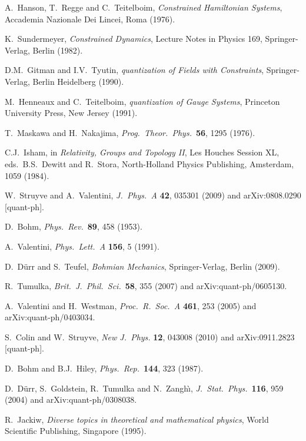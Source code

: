 \documentclass[12pt]{article}
\begin{document}
\begin{thebibliography}{100}
{A.\ Hanson, T.\ Regge and C.\ Teitelboim, {\em Constrained Hamiltonian
  Systems}, Accademia Nazionale Dei Lincei, Roma (1976).}

{K.\ Sundermeyer, {\em Constrained Dynamics}, Lecture Notes in Physics 169,
  Springer-Verlag, Berlin (1982).}

{D.M.\ Gitman and I.V.\ Tyutin, {\em quantization of Fields with Constraints},
  Springer-Verlag, Berlin Heidelberg (1990).}

{M.\ Henneaux and C.\ Teitelboim, {\em quantization of Gauge Systems},
  Princeton University Press, New Jersey (1991).}

{T.\ Maskawa and H.\ Nakajima, {\em Prog.\ Theor.\ Phys.}\ {\bf 56}, 1295
  (1976).}

{C.J.\ Isham, in {\em Relativity, Groups and Topology II}, Les Houches Session
  XL, eds.\ B.S.\ Dewitt and R.\ Stora, North-Holland Physics Publishing,
  Amsterdam, 1059 (1984).}

{W.\ Struyve and A.\ Valentini, {\em J.\ Phys.\ A} {\bf 42}, 035301 (2009) and
  arXiv:0808.0290 [quant-ph].}

{D.\ Bohm, {\em Phys.\ Rev.}\ {\bf 89}, 458 (1953).}

{A.\ Valentini, {\em Phys.\ Lett.\ A} {\bf 156}, 5 (1991).}

{D.\ D\"urr and S.\ Teufel, {\em Bohmian Mechanics}, Springer-Verlag, Berlin
  (2009).}

{R.\ Tumulka, {\em Brit.\ J.\ Phil.\ Sci.}\ {\bf 58}, 355 (2007) and
  arXiv:quant-ph/0605130.}

{A.\ Valentini and H.\ Westman, {\em Proc.\ R.\ Soc.\ A} {\bf 461}, 253 (2005)
  and arXiv:quant-ph/0403034.}

{S.\ Colin and W.\ Struyve, {\em New J.\ Phys.} {\bf 12}, 043008 (2010) and
  arXiv:0911.2823 [quant-ph].}

{D.\ Bohm and B.J.\ Hiley, {\em Phys.\ Rep.}\ {\bf 144}, 323 (1987).}

{D.\ D\"urr, S.\ Goldstein, R.\ Tumulka and N.\ Zangh\`\i, {\em J.\ Stat.\
  Phys.}\ {\bf 116}, 959 (2004) and arXiv:quant-ph/0308038.}

{R.\ Jackiw, {\em Diverse topics in theoretical and mathematical physics},
  World Scientific Publishing, Singapore (1995).}


\end{thebibliography}
\end{document}
